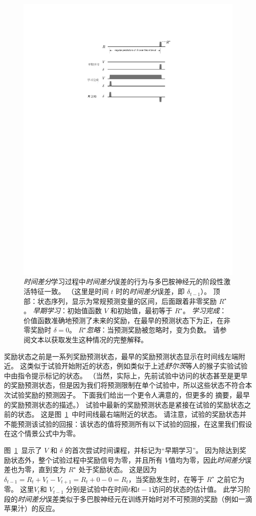 \begin{figure}[!htb]
	\centering
	\includegraphics[width=0.5\linewidth]{chap12/fig_12_5}
	\caption{\textit{时间差分}学习过程中\textit{时间差分}误差的行为与多巴胺神经元的阶段性激活特征一致。
		（这里是时间 $t$ 时的\textit{时间差分}误差，即 $\delta_{t-1}$）。
		顶部：状态序列，显示为常规预测变量的区间，后面跟着非零奖励 $R^{\star}$。
		\textit{早期学习}：初始值函数 $V$ 和初始值，最初等于 $R^{\star}$。
		\textit{学习完成}：价值函数准确地预测了未来的奖励，在最早的预测状态下为正，在非零奖励时 $\delta = 0$。
		\textit{$R^{\star}$忽略}：当预测奖励被忽略时，变为负数。
		请参阅文本以获取发生这种情况的完整解释。
		\label{fig:12_5}}
\end{figure}


奖励状态之前是一系列奖励预测状态，最早的奖励预测状态显示在时间线左端附近。
这类似于试验开始附近的状态，例如类似于上述\textit{舒尔茨}等人\cite{schultz1993responses}的猴子实验试验中由指令提示标记的状态。
（当然，实际上，先前试验中访问的状态甚至是更早的奖励预测状态，但是因为我们将预测限制在单个试验中，所以这些状态不符合本次试验奖励的预测因子。
下面我们给出一个更令人满意的，但更多的 摘要，最早的奖励预测状态的描述。）
试验中最新的奖励预测状态是紧接在试验的奖励状态之前的状态。
这是图~\ref{fig:12_5}~中时间线最右端附近的状态。
请注意，试验的奖励状态并不能预测该试验的回报：该状态的值将预测所有以下试验的回报，在这里我们假设在这个情景公式中为零。


图~\ref{fig:12_5}~显示了 $V$ 和 $\delta$ 的首次尝试时间课程，并标记为“早期学习”。 
因为除达到奖励状态外，整个试验过程中奖励信号为零，并且所有 $V$值均为零，因此\textit{时间差分}误差也为零，直到变为 $R^{\star}$ 处于奖励状态。
这是因为 $\delta_{t-1} = R_t + V_t - V_{t+1} = R_t + 0 - 0 = R_t$，当奖励发生时，在等于 $R^{\star}$ 之前它为零。
这里$V_t$和 $V_{t-1}$ 分别是试验中在时间$t$和$t-1$访问的状态的估计值。
此学习阶段的\textit{时间差分}误差类似于多巴胺神经元在训练开始时对不可预测的奖励（例如一滴苹果汁）的反应。



